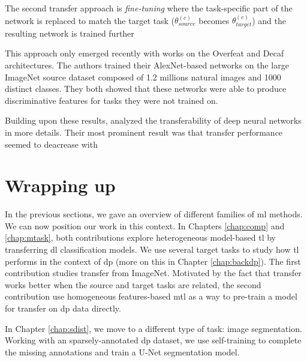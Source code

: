 The second transfer approach is \textit{fine-tuning} where the task-specific part of the network is replaced to match the target task (\ie $\theta^{(c)}_{source}$ becomes $\theta^{(c)}_{target}$) and the resulting network is trained further   

This approach only emerged recently with works on the Overfeat \parencite{sermanet2013overfeat, razavian2014cnn} and Decaf \parencite{donahue2014decaf} architectures. The authors trained their AlexNet-based networks on the large ImageNet source dataset composed of 1.2 millions natural images and 1000 distinct classes. They both showed that these networks were able to produce discriminative features for tasks they were not trained on.

Building upon these results, \parencite{yosinski2014transferable} analyzed the transferability of deep neural networks in more details. Their most prominent result was that transfer performance seemed to deacrease with  

\section{Wrapping up}

In the previous sections, we gave an overview of different families of \acrlong{ml} methods. We can now position our work in this context. In Chapters \ref{chap:comp} and \ref{chap:mtask}, both contributions explore heterogeneous model-based \acrlong{tl} by transferring \acrlong{dl} classification models. We use several target tasks to study how \acrlong{tl} performs in the context of \acrlong{dp} (more on this in Chapter \ref{chap:backdp}). The first contribution studies transfer from ImageNet. Motivated by the fact that transfer works better when the source and target tasks are related, the second contribution use homogeneous features-based \acrlong{mtl} as a way to pre-train a model for transfer on \acrlong{dp} data directly.

In Chapter \ref{chap:sdist}, we move to a different type of task: image segmentation. Working with an sparsely-annotated \acrlong{dp} dataset, we use self-training to complete the missing annotations and train a U-Net segmentation model.  

